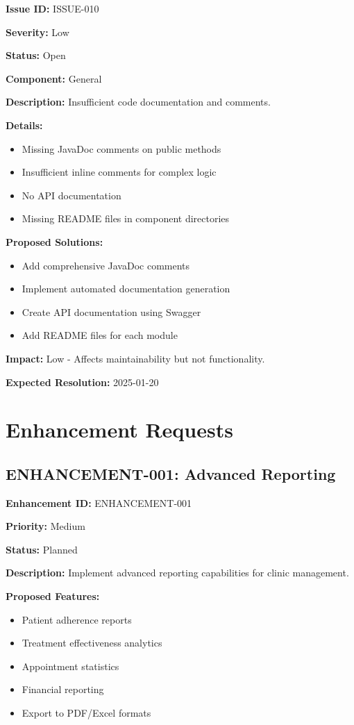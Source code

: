 \documentclass[12pt,a4paper]{article}
\begin{document}
\textbf{Issue ID:} ISSUE-010

\textbf{Severity:} Low

\textbf{Status:} Open

\textbf{Component:} General

\textbf{Description:} Insufficient code documentation and comments.

\textbf{Details:}
\begin{itemize}
    \item Missing JavaDoc comments on public methods
    \item Insufficient inline comments for complex logic
    \item No API documentation
    \item Missing README files in component directories
\end{itemize}

\textbf{Proposed Solutions:}
\begin{itemize}
    \item Add comprehensive JavaDoc comments
    \item Implement automated documentation generation
    \item Create API documentation using Swagger
    \item Add README files for each module
\end{itemize}

\textbf{Impact:} Low - Affects maintainability but not functionality.

\textbf{Expected Resolution:} 2025-01-20

\section{Enhancement Requests}

\subsection{ENHANCEMENT-001: Advanced Reporting}

\textbf{Enhancement ID:} ENHANCEMENT-001

\textbf{Priority:} Medium

\textbf{Status:} Planned

\textbf{Description:} Implement advanced reporting capabilities for clinic management.

\textbf{Proposed Features:}
\begin{itemize}
    \item Patient adherence reports
    \item Treatment effectiveness analytics
    \item Appointment statistics
    \item Financial reporting
    \item Export to PDF/Excel formats
\end{itemize}
\end{document}
